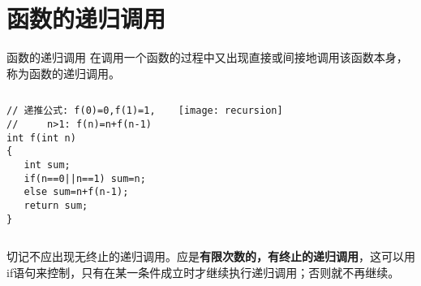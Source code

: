 \section{函数的递归调用}

\begin{frame}{函数的递归调用}
在调用一个函数的过程中又出现直接或间接地调用该函数本身，称为函数的递归调用。
\begin{columns}[T]
\begin{lstlisting}
// 递推公式: f(0)=0,f(1)=1, 
//     n>1: f(n)=n+f(n-1)
int f(int n) 
{
   int sum;
   if(n==0||n==1) sum=n;
   else sum=n+f(n-1); 
   return sum; 
}
\end{lstlisting}
\texttt{[image: recursion]}
\end{columns}
切记不应出现无终止的递归调用。应是\textbf{有限次数的，有终止的递归调用}，这可以用if语句来控制，只有在某一条件成立时才继续执行递归调用；否则就不再继续。
\end{frame}

